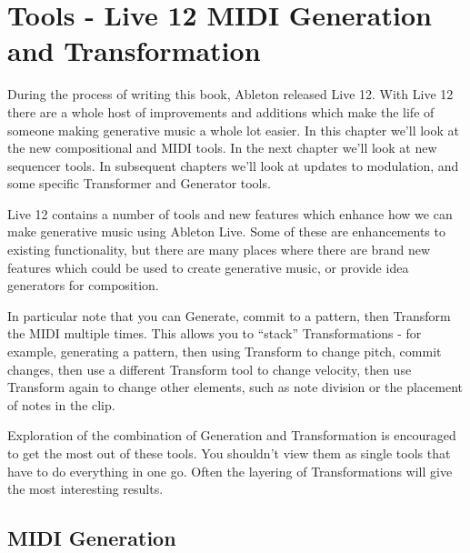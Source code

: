\documentclass[
  12pt,
  letterpaper,
  oneside,
  open=any]{scrbook}
\begin{document}
\chapter{Tools - Live 12 MIDI Generation and
Transformation}\label{Chapter-033-Tools-Live12_MIDI_Generation_Transformation}

During the process of writing this book, Ableton released Live 12. With
Live 12 there are a whole host of improvements and additions which make
the life of someone making generative music a whole lot easier. In this
chapter we'll look at the new compositional and MIDI tools. In the next
chapter we'll look at new sequencer tools. In subsequent chapters we'll
look at updates to modulation, and some specific Transformer and
Generator tools.

\begin{tcolorbox}[enhanced jigsaw, opacitybacktitle=0.6, rightrule=.15mm, leftrule=.75mm, opacityback=0, toptitle=1mm, toprule=.15mm, breakable, titlerule=0mm, colback=white, bottomtitle=1mm, title=\textcolor{quarto-callout-tip-color}{\faLightbulb}\hspace{0.5em}{Key idea}, coltitle=black, left=2mm, colframe=quarto-callout-tip-color-frame, bottomrule=.15mm, colbacktitle=quarto-callout-tip-color!10!white, arc=.35mm]

Live 12 contains a number of tools and new features which enhance how we
can make generative music using Ableton Live. Some of these are
enhancements to existing functionality, but there are many places where
there are brand new features which could be used to create generative
music, or provide idea generators for composition.

In particular note that you can Generate, commit to a pattern, then
Transform the MIDI multiple times. This allows you to ``stack''
Transformations - for example, generating a pattern, then using
Transform to change pitch, commit changes, then use a different
Transform tool to change velocity, then use Transform again to change
other elements, such as note division or the placement of notes in the
clip.

Exploration of the combination of Generation and Transformation is
encouraged to get the most out of these tools. You shouldn't view them
as single tools that have to do everything in one go. Often the layering
of Transformations will give the most interesting results.

\end{tcolorbox}

\section{MIDI Generation}\label{midi-generation-1}
\end{document}
